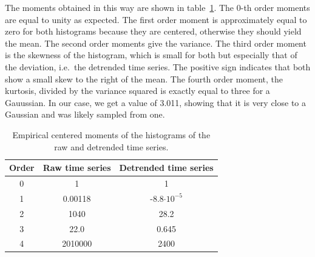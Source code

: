 \documentclass[a4paper,DIV=12,english]{scrartcl}
\begin{document}
The moments obtained in this way are shown in table~\ref{tab:moments}. The 0-th order moments are equal to unity as expected. The first order moment is approximately equal to zero for both histograms because they are centered, otherwise they should yield the mean. The second order moments give the variance. The third order moment is the skewness of the histogram, which is small for both but especially that of the deviation, i.e.\ the detrended time series. The positive sign indicates that both show a small skew to the right of the mean. The fourth order moment, the kurtosis, divided by the variance squared is exactly equal to three for a Gauussian. In our case, we get a value of 3.011, showing that it is very close to a Gaussian and was likely sampled from one.
\begin{table}
    \centering
    \caption{Empirical centered moments of the histograms of the raw and detrended time series.}
    \begin{tabular}{c||c|c}
        Order & Raw time series & Detrended time series \\ \hline
        0 & 1 & 1\\
        1 & 0.00118 & -8.8$\cdot 10^{-5}$\\
        2 & 1040 & 28.2\\
        3 & 22.0 & 0.645 \\
        4 & 2010000 & 2400 \\        
    \end{tabular}
    \label{tab:moments}
\end{table}
\end{document}
